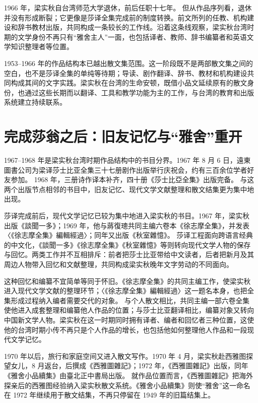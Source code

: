 \documentclass[UTF8,a4paper,zihao=-4,fontset=none]{ctexart}
\begin{document}
1966 年，梁实秋自台湾师范大学退休，前后任职十七年。\autocite{nmtl_liang_chronology} 但从作品序列看，退休并没有形成断裂；它更像是莎译全集完成前的制度转换。前文所列的任教、机构建设和辞书教材出版，共同构成一条较长的工作线。沿着这条线观察，梁实秋台湾时期的文学身份不再只有“雅舍主人”一面，也包括译者、教师、辞书编纂者和英语文学知识整理者等位置。

1953--1966 年的作品结构本已越出散文集范围。这一阶段既不是两部散文集之间的空白，也不是莎译全集的单纯等待期；导读、剧作翻译、辞书、教材和机构建设共同构成其间的文字实践。梁实秋在台湾的生命安顿，既借小品文延续原有的散文身份，也通过这些长期而以翻译、工具和教学功能为主的工作，与台湾的教育和出版系统建立持续联系。

\section{完成莎翁之后：旧友记忆与“雅舍”重开}

1967--1968 年是梁实秋台湾时期作品结构中的书目分界。1967 年 8 月 6 日，遠東圖書公司为梁译莎士比亚全集三十七册剧作出版举行庆祝会，约有三百余位学者好友参加。\autocite{nmtl_liang_chronology} 1968 年，三册诗作译本补齐，四十册《莎士比亞全集》出版完备。\autocite{nmtl_liang_chronology,shakespeare1968_liang_quanji,liang1974_on_translating_shakespeare} 与这两个出版节点相邻的书目中，旧友记忆、现代文学文献整理和散文结集更为集中地出现。

莎译完成前后，现代文学记忆已较为集中地进入梁实秋的书目。1967 年，梁实秋出版《談聞一多》；1969 年，他与蔣復璁共同主编六卷本《徐志摩全集》，并发表〈《徐志摩全集》編輯經過〉；同年又出版《秋室雜憶》。\autocite{nmtl_liang_chronology} 莎译工程面向跨语言经典的中文化，《談聞一多》《徐志摩全集》《秋室雜憶》等则转向现代文学人物的保存与回忆。两类工作并不互相排斥：前者把莎士比亚带给中文读者，后者把新月及其周边人物带入回忆和文献整理，共同构成梁实秋晚年文字劳动的不同面向。

这种回忆和编纂不宜简单等同于怀旧。《徐志摩全集》的共同主编工作，使梁实秋进入现代文学文献的整理环节；〈《徐志摩全集》編輯經過〉这一题名本身，也把全集形成过程纳入编者需要交代的对象。\autocite{nmtl_liang_chronology} 与个人散文相比，共同主编一部六卷全集使他进入成套整理和编纂他人作品的位置；与莎士比亚翻译相比，编纂对象又转向中国新文学人物。梁实秋在这一时期同时拥有译者、编者和回忆者三种位置，这使他的台湾时期小传不再只是个人作品的增长，也包括他如何整理他人作品和一段现代文学记忆。

1970 年以后，旅行和家庭空间又进入散文写作。1970 年 4 月，梁实秋赴西雅图探望女儿，8 月返台，后撰成《西雅圖雜記》；1972 年，《西雅圖雜記》出版，同年《雅舍小品續集》由臺北正中書局出版。\autocite{nmtl_liang_chronology,liang1972_yashe_xiaopin_xuji} 就作品位置而言，《西雅圖雜記》把海外探亲后的西雅图经验纳入梁实秋散文系统。《雅舍小品續集》则使“雅舍”这一命名在 1972 年继续用于散文结集，不再只停留在 1949 年的旧篇结集上。
\end{document}
